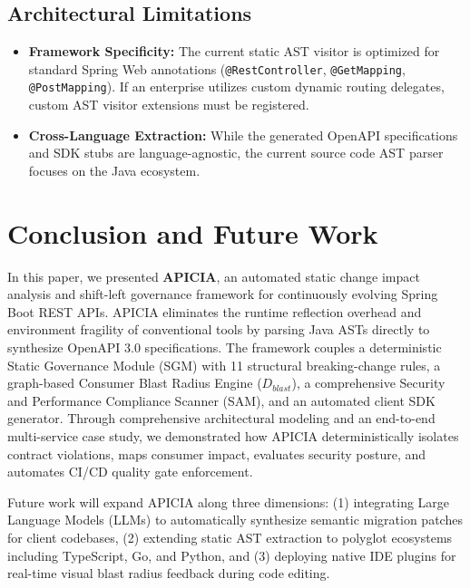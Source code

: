 \documentclass[conference]{IEEEtran}
\begin{document}
\subsection{Architectural Limitations}
\begin{itemize}
    \item \textbf{Framework Specificity:} The current static AST visitor is optimized for standard Spring Web annotations (\texttt{@RestController}, \texttt{@GetMapping}, \texttt{@PostMapping}). If an enterprise utilizes custom dynamic routing delegates, custom AST visitor extensions must be registered.
    \item \textbf{Cross-Language Extraction:} While the generated OpenAPI specifications and SDK stubs are language-agnostic, the current source code AST parser focuses on the Java ecosystem.
\end{itemize}

\section{Conclusion and Future Work}
\label{sec:conclusion}
In this paper, we presented \textbf{APICIA}, an automated static change impact analysis and shift-left governance framework for continuously evolving Spring Boot REST APIs. APICIA eliminates the runtime reflection overhead and environment fragility of conventional tools by parsing Java ASTs directly to synthesize OpenAPI 3.0 specifications. The framework couples a deterministic Static Governance Module (SGM) with 11 structural breaking-change rules, a graph-based Consumer Blast Radius Engine ($D_{blast}$), a comprehensive Security and Performance Compliance Scanner (SAM), and an automated client SDK generator. Through comprehensive architectural modeling and an end-to-end multi-service case study, we demonstrated how APICIA deterministically isolates contract violations, maps consumer impact, evaluates security posture, and automates CI/CD quality gate enforcement.

Future work will expand APICIA along three dimensions: (1) integrating Large Language Models (LLMs) to automatically synthesize semantic migration patches for client codebases, (2) extending static AST extraction to polyglot ecosystems including TypeScript, Go, and Python, and (3) deploying native IDE plugins for real-time visual blast radius feedback during code editing.
\end{document}
